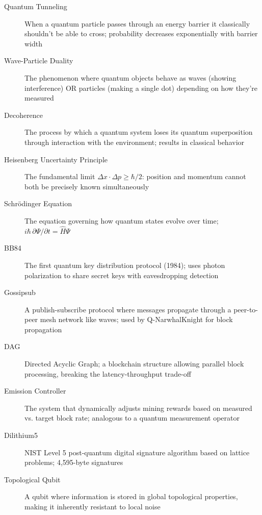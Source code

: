 \documentclass[11pt,a4paper]{article}
\begin{document}
\begin{description}
    \item[Quantum Tunneling] When a quantum particle passes through an energy barrier it classically shouldn't be able to cross; probability decreases exponentially with barrier width

    \item[Wave-Particle Duality] The phenomenon where quantum objects behave as waves (showing interference) OR particles (making a single dot) depending on how they're measured

    \item[Decoherence] The process by which a quantum system loses its quantum superposition through interaction with the environment; results in classical behavior

    \item[Heisenberg Uncertainty Principle] The fundamental limit $\Delta x \cdot \Delta p \geq \hbar/2$: position and momentum cannot both be precisely known simultaneously

    \item[Schr\"{o}dinger Equation] The equation governing how quantum states evolve over time; $i\hbar\,\partial\Psi/\partial t = \hat{H}\Psi$

    \item[BB84] The first quantum key distribution protocol (1984); uses photon polarization to share secret keys with eavesdropping detection

    \item[Gossipsub] A publish-subscribe protocol where messages propagate through a peer-to-peer mesh network like waves; used by Q-NarwhalKnight for block propagation

    \item[DAG] Directed Acyclic Graph; a blockchain structure allowing parallel block processing, breaking the latency-throughput trade-off

    \item[Emission Controller] The system that dynamically adjusts mining rewards based on measured vs. target block rate; analogous to a quantum measurement operator

    \item[Dilithium5] NIST Level 5 post-quantum digital signature algorithm based on lattice problems; 4,595-byte signatures

    \item[Topological Qubit] A qubit where information is stored in global topological properties, making it inherently resistant to local noise
\end{description}
\end{document}
